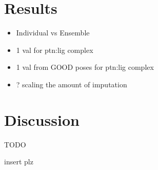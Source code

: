 \documentclass[journal=jmcmar,manuscript=article]{achemso}
\begin{document}

\section{Results}

\begin{itemize}
    \item Individual vs Ensemble
    \item 1 val for ptn:lig complex
    \item 1 val from GOOD poses for ptn:lig complex
    \item ? scaling the amount of imputation
\end{itemize}

\section{Discussion}
TODO


\begin{acknowledgement}


insert plz

\end{acknowledgement}

\begin{suppinfo}

\end{suppinfo}


\end{document}
